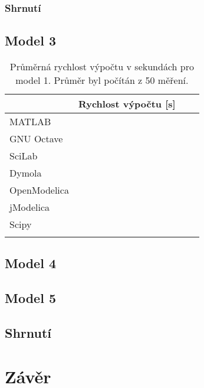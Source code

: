 \subsection{Shrnutí}

\section{Model 3}
\label{srovnani-tuhy}


\begin{table}[ht]
\centering
\begin{tabular}{|l|l|l|l|}
\hline
             & Rychlost výpočtu {[}s{]} &  &  \\ \hline
MATLAB       &                          &  &  \\ \hline
GNU Octave   &                          &  &  \\ \hline
SciLab       &                          &  &  \\ \hline
Dymola       &                          &  &  \\ \hline
OpenModelica &                          &  &  \\ \hline
jModelica    &                          &  &  \\ \hline
Scipy        &                          &  &  \\ \hline
             &                          &  &  \\ \hline
\end{tabular}
\caption{Průměrná rychlost výpočtu v sekundách pro model 1. Průměr byl počítán z 50 měření.}
\label{tab:tuhy-tabulka}
\end{table}

\section{Model 4}

\section{Model 5}


\section{Shrnutí}




\chapter{Závěr}
\label{kapitola6}


